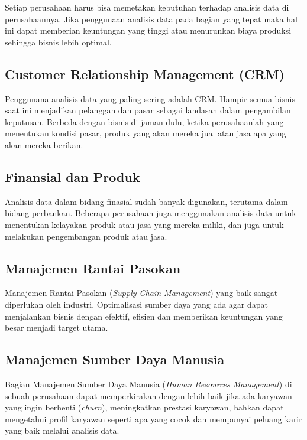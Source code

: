 \documentclass[]{book}
\begin{document}
Setiap perusahaan harus bisa memetakan kebutuhan terhadap analisis data di perusahaannya. Jika penggunaan analisis data pada bagian yang tepat maka hal ini dapat memberian keuntungan yang tinggi atau menurunkan biaya produksi sehingga bisnis lebih optimal.

\hypertarget{customer-relationship-management-crm}{%
\subsection{Customer Relationship Management (CRM)}\label{customer-relationship-management-crm}}

Penggunana analisis data yang paling sering adalah CRM. Hampir semua bisnis saat ini menjadikan pelanggan dan pasar sebagai landasan dalam pengambilan keputusan. Berbeda dengan bisnis di jaman dulu, ketika perusahaanlah yang menentukan kondisi pasar, produk yang akan mereka jual atau jasa apa yang akan mereka berikan.

\hypertarget{finansial-dan-produk}{%
\subsection{Finansial dan Produk}\label{finansial-dan-produk}}

Analisis data dalam bidang finasial sudah banyak digunakan, terutama dalam bidang perbankan. Beberapa perusahaan juga menggunakan analisis data untuk menentukan kelayakan produk atau jasa yang mereka miliki, dan juga untuk melakukan pengembangan produk atau jasa.

\hypertarget{manajemen-rantai-pasokan}{%
\subsection{Manajemen Rantai Pasokan}\label{manajemen-rantai-pasokan}}

Manajemen Rantai Pasokan (\emph{Supply Chain Management}) yang baik sangat diperlukan oleh industri. Optimalisasi sumber daya yang ada agar dapat menjalankan bisnis dengan efektif, efisien dan memberikan keuntungan yang besar menjadi target utama.

\hypertarget{manajemen-sumber-daya-manusia}{%
\subsection{Manajemen Sumber Daya Manusia}\label{manajemen-sumber-daya-manusia}}

Bagian Manajemen Sumber Daya Manusia (\emph{Human Resources Management}) di sebuah perusahaan dapat memperkirakan dengan lebih baik jika ada karyawan yang ingin berhenti (\emph{churn}), meningkatkan prestasi karyawan, bahkan dapat mengetahui profil karyawan seperti apa yang cocok dan mempunyai peluang karir yang baik melalui analisis data.
\end{document}

